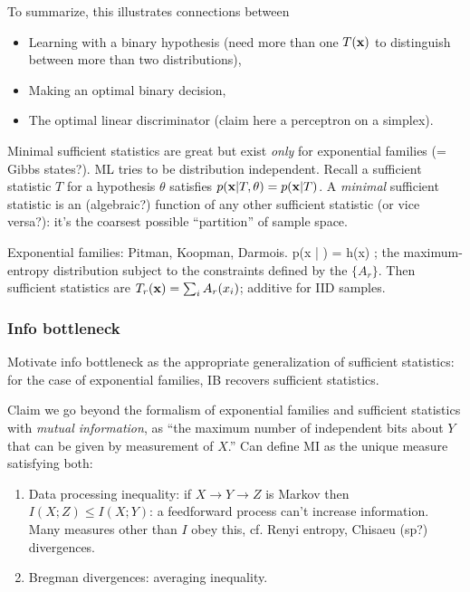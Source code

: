 \documentclass[notitlepage,openany,11pt]{report}
\theoremstyle{plain}%
\numberwithin{equation}{section}
\begin{document}
To summarize, this illustrates connections between
\begin{itemize}
\item Learning with a binary hypothesis (need more than one $T(\mathbf{x})$ to distinguish between more than two distributions),
\item Making an optimal binary decision,
\item The optimal linear discriminator (claim here a perceptron on a simplex).
\end{itemize}

Minimal sufficient statistics are great but exist \emph{only} for exponential families (= Gibbs states?). ML tries to be distribution independent. Recall a sufficient statistic $T$ for a hypothesis $\theta$ satisfies $p(\mathbf{x}|T,\theta) = p(\mathbf{x}|T)$. A \emph{minimal} sufficient statistic is an (algebraic?) function of any other sufficient statistic (or vice versa?): it's the coarsest possible ``partition'' of sample space.

Exponential families: Pitman, Koopman, Darmois.
\be
p(x | \theta) = h(x) \exp {};
\ee
the maximum-entropy distribution subject to the constraints defined by the $\{ A_{r}\}$. Then sufficient statistics are $T_{r}(\mathbf{x}) = \sum_{i} A_{r}(x_{i})$; additive for IID samples.

\subsubsection{Info bottleneck}
Motivate info bottleneck as the appropriate generalization of sufficient statistics: for the case of exponential families, IB recovers sufficient statistics.

Claim we go beyond the formalism of exponential families and sufficient statistics with \emph{mutual information}, as ``the maximum number of independent bits about $Y$ that can be given by measurement of $X$.'' Can define MI as the unique measure satisfying both:
\begin{enumerate}
\item Data processing inequality: if $X \rightarrow Y \rightarrow Z$ is Markov then $I(X;Z) \leq I(X;Y)$: a feedforward process can't increase information. Many measures other than $I$ obey this, cf. Renyi entropy, Chisaeu (sp?) divergences.
\item Bregman divergences: averaging inequality.
\end{enumerate}
\end{document}
